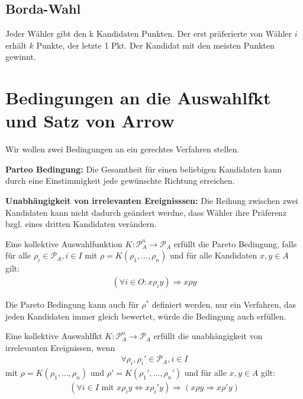 \subsection{Borda-Wahl}  
Jeder Wähler gibt den k Kandidaten Punkten. Der erst präferierte von Wähler $i$ erhält $k$ Punkte, der letzte 1 Pkt. Der Kandidat mit den meisten Punkten gewinnt. 

\section{Bedingungen an die Auswahlfkt und Satz von Arrow}

Wir wollen zwei Bedingungen an ein gerechtes Verfahren stellen. 

\textbf{Parteo Bedingung: } 
Die Gesamtheit für einen beliebigen Kandidaten kann durch eine Einstimmigkeit jede gewünschte Richtung erreichen.

\textbf{Unabhängigkeit von irrelevanten Ereignisssen: } Die Reihung zwischen zwei Kandidaten kann nicht dadurch geändert werdne, dass Wähler ihre Präferenz bzgl. eines dritten Kandidaten verändern. 

\begin{defi}
	Eine kollektive Auswahlfunktion $K: \mathcal{P}_A^n \rightarrow \mathcal{P}_A$ erfüllt die Pareto Bedingung, falls für alle $\rho_i \in \mathcal{P}_A, i \in I$ mit $\rho = K(\rho_1, \dots, \rho_n)$ und für alle Kandidaten $x,y \in A$ gilt: 
	\begin{align*}
		(\forall i \in O: x \rho_i y) \Rightarrow x \rho y
	\end{align*}
\end{defi} 

Die Pareto Bedingung kann auch für $\rho^*$ definiert werden, nur ein Verfahren, das jeden Kandidaten immer gleich bewertet, würde die Bedingung auch erfüllen. 

\begin{defi}
	Eine kollektive Auswahlfkt $K: \mathcal{P}_A^n \rightarrow \mathcal{P}_A$ erfüllt die unabhängigkeit von irrelevanten Ereignissen, wenn 
	\begin{align*}
		\forall \rho_i, \rho_i' \in \mathcal{P}_A, i \in I
	\end{align*}
	mit $\rho=K(\rho_1, \dots, \rho_n)$ und $\rho'=K(\rho_1', \dots, \rho_n')$ und für alle $x,y \in A$ gilt: 
	\begin{align*}
		(\forall i \in I \text{ mit } x \rho_i y \Leftrightarrow x \rho_i' y) \Rightarrow (x \rho y \Rightarrow x \rho' y)
	\end{align*}
\end{defi}

